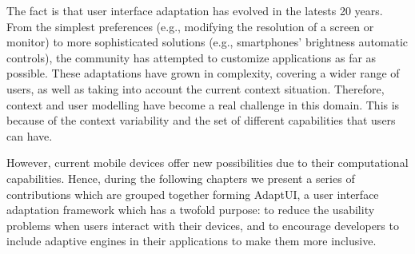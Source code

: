 The fact is that user interface adaptation has evolved in the latests 20 years.
From the simplest preferences (e.g., modifying the resolution of a screen or
monitor) to more sophisticated solutions (e.g., smartphones' brightness automatic
controls), the community has attempted to customize applications as far as 
possible. These adaptations have grown in complexity, covering a wider range of 
users, as well as taking into account the current context situation. Therefore, 
context and user modelling have become a real challenge in this domain. This is 
because of the context variability and the set of different capabilities that 
users can have.

However, current mobile devices offer new possibilities due to their 
computational capabilities. Hence, during the following chapters we present a
series of contributions which are grouped together forming AdaptUI, a user 
interface adaptation framework which has a twofold purpose: to reduce the 
usability problems when users interact with their devices, and to encourage 
developers to include adaptive engines in their applications to make them more 
inclusive.






